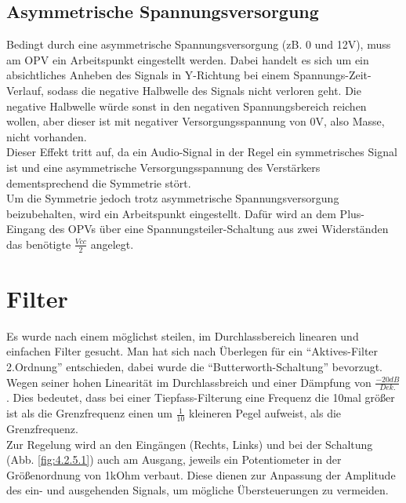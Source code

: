 \subsection{Asymmetrische Spannungsversorgung}\label{subsec3.2.5}
Bedingt durch eine asymmetrische Spannungsversorgung (zB. 0 und 12V), muss am OPV ein Arbeitspunkt eingestellt werden.
Dabei handelt es sich um ein absichtliches Anheben des Signals in Y-Richtung bei einem Spannungs-Zeit-Verlauf, sodass die negative Halbwelle des Signals nicht verloren geht.
Die negative Halbwelle würde sonst in den negativen Spannungsbereich reichen wollen, aber dieser ist mit negativer Versorgungsspannung von 0V, also Masse, nicht vorhanden.\\
Dieser Effekt tritt auf, da ein Audio-Signal in der Regel ein symmetrisches Signal ist und eine asymmetrische Versorgungsspannung des Verstärkers dementsprechend die Symmetrie stört.\\
Um die Symmetrie jedoch trotz asymmetrische Spannungsversorgung beizubehalten, wird ein Arbeitspunkt eingestellt.
Dafür wird an dem Plus-Eingang des OPVs über eine Spannungsteiler-Schaltung aus zwei Widerständen das benötigte $\frac{Vcc}{2}$ angelegt.


\section{Filter}\label{sec:3.3}
Es wurde nach einem möglichst steilen, im Durchlassbereich linearen und einfachen Filter gesucht.
Man hat sich nach Überlegen für ein \enquote{Aktives-Filter 2.Ordnung} entschieden, dabei wurde die \enquote{Butterworth-Schaltung} bevorzugt.
Wegen seiner hohen Linearität im Durchlassbreich und einer Dämpfung von $\frac{-20dB}{Dek.}$ .
Dies bedeutet, dass bei einer Tiepfass-Filterung eine Frequenz die 10mal größer ist als die Grenzfrequenz einen um $\frac{1}{10}$ kleineren Pegel aufweist, als die Grenzfrequenz.\\
Zur Regelung wird an den Eingängen (Rechts, Links) und bei der Schaltung (Abb. \ref{fig:4.2.5.1}) auch am Ausgang, jeweils ein Potentiometer in der Größenordnung von 1kOhm verbaut.
Diese dienen zur Anpassung der Amplitude des ein- und ausgehenden Signals, um mögliche Übersteuerungen zu vermeiden.

